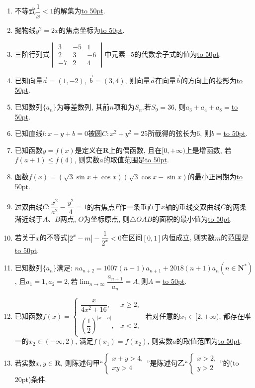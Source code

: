\documentclass[10pt,a4paper]{article}
\newcommand{\blank}[1]{\underline{\hbox to #1pt{}}}
\newcommand{\bracket}[1]{(\hbox to #1pt{})}
\begin{document}
\begin{enumerate}[1.]
\item 不等式$\dfrac 1x<1$的解集为\blank{50}.
\item 抛物线$y^2=2x$的焦点坐标为\blank{50}.
\item 三阶行列式$\begin{vmatrix}
3 & -5 & 1  \\ 2 & 3 & -6  \\ -7 & 2 & 4  \end{vmatrix}$中元素$-5$的代数余子式的值为\blank{50}.
\item 已知向量$\overrightarrow a=(1,-2)$, $\overrightarrow b=(3,4)$, 则向量$\overrightarrow a$在向量$\overrightarrow b$的方向上的投影为\blank{50}.
\item 已知数列$\{a_n\}$为等差数列, 其前$n$项和为$S_n$.若$S_9=36$, 则$a_3+a_4+a_8=$\blank{50}.
\item 已知直线$l:x-y+b=0$被圆$C:x^2+y^2=25$所截得的弦长为$6$, 则$b=$\blank{50}.
\item 已知函数$y=f(x)$是定义在$\mathbf{R}$上的偶函数, 且在$[0,+\infty)$上是增函数, 若$f(a+1)\le f(4)$, 则实数$a$的取值范围是\blank{50}.
\item 函数$f(x)=(\sqrt 3\sin x+\cos x)(\sqrt 3\cos x-\sin x)$的最小正周期为\blank{50}.
\item 过双曲线$C:\dfrac{x^2}{a^2}-\dfrac{y^2}4=1$的右焦点$F$作一条垂直于$x$轴的垂线交双曲线$C$的两条渐近线于$A$、$B$两点, $O$为坐标原点, 则$\triangle OAB$的面积的最小值为\blank{50}.
\item 若关于$x$的不等式$|2^x-m|-\dfrac 1{2^x}<0$在区间$[0,1]$内恒成立, 则实数$m$的范围是\blank{50}.
\item 已知数列$\{a_n\}$满足: $na_{n+2}=1007(n-1)a_{n+1}+2018(n+1)a_n(n\in \mathbf{N}^*)$, 且$a_1=1,a_2=2,$若$\displaystyle\lim_{n\to\infty} \dfrac{a_{n+1}}{a_n}=A,$则$A=$\blank{50}.
\item 已知函数$f(x)=\begin{cases} \dfrac x{4x^2+16}, & x\ge 2, \\ (\dfrac 12)^{|x-a|}, & x<2, \end{cases}$ 若对任意的$x_1\in [2,+\infty)$, 都存在唯一的$x_2\in (-\infty ,2)$, 满足$f(x_1)=f(x_2)$, 则实数$a$的取值范围为\blank{50}.
\item 若实数$x,y\in \mathbf{R}$, 则陈述句甲``$\begin{cases} x+y>4, \\ xy>4 \end{cases}$''是陈述句乙``$\begin{cases} x>2, \\ y>2 \end{cases}$''的\bracket{20}条件.

\end{enumerate}
\end{document}
